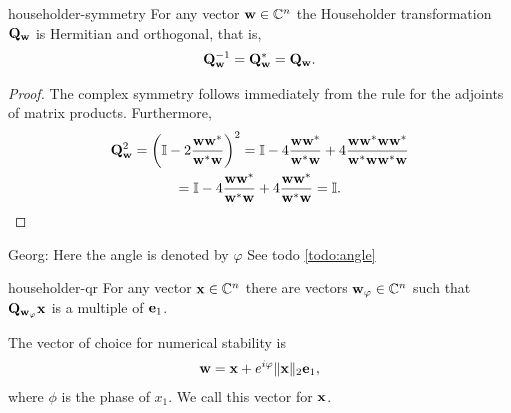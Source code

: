 \begin{Lemma}{householder-symmetry}
  For any vector $\mathbf w\in\mathbb C^n$ the Householder transformation
  $\mathbf Q_{\mathbf w}$ is Hermitian and orthogonal, that is,
  \begin{gather}
    \mathbf Q_{\mathbf w}^{-1} = \mathbf Q_{\mathbf w}^* = \mathbf Q_{\mathbf w}.
  \end{gather}
\end{Lemma}

\begin{proof}
  The complex symmetry follows immediately from the rule for the
  adjoints of matrix products. Furthermore,
  \begin{multline}
    \mathbf Q_{\mathbf w}^2 = \left(\mathbb I - 2\frac{\mathbf w\mathbf w^*}{\mathbf w^*\mathbf w}\right)^2
    = \mathbb I - 4\frac{\mathbf w\mathbf w^*}{\mathbf w^*\mathbf w} + 4\frac{\mathbf w\mathbf w^*\mathbf w\mathbf w^*}{\mathbf w^*\mathbf w\mathbf w^*\mathbf w}
    \\
    = \mathbb I - 4\frac{\mathbf w\mathbf w^*}{\mathbf w^*\mathbf w} + 4\frac{\mathbf w\mathbf w^*}{\mathbf w^*\mathbf w} = \mathbb I.
  \end{multline}
\end{proof}
\begin{todo}
  Georg: Here the angle is denoted by \(\varphi\) See todo \ref{todo:angle}
\end{todo}

\begin{Lemma}{householder-qr}
  For any vector $\mathbf x\in\mathbb C^n$ there are vectors $\mathbf w_\varphi\in\mathbb C^n$ such
  that $\mathbf Q_{\mathbf w_\varphi} \mathbf x$ is a multiple of $\mathbf e_1$.

  The vector of choice for numerical stability is
  \begin{gather}
    \label{eq:ortho:householder:1}
    \mathbf w = \mathbf x + e^{i\varphi} \lVert\mathbf x\rVert_2\mathbf e_1,
  \end{gather}
  where $\phi$ is the phase of $x_1$. We call this vector  for $\mathbf x$.
\end{Lemma}

